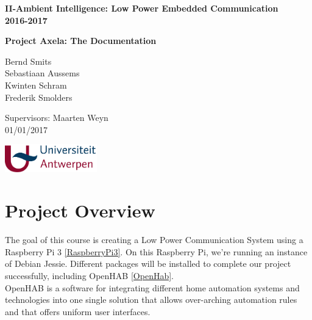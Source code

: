 \documentclass[a4paper,notitlepage]{article}
\begin{document}
\begin{titlepage}
    \centering
    \vfill
    {\bfseries\Large
        II-Ambient Intelligence: Low Power Embedded Communication\\2016-2017\\
        
    } 
    
    \hrulefill
    \vskip4cm
    
    {\bfseries\large
            Project Axela: The Documentation\\
            \vskip2cm
            
            Bernd Smits\\
            Sebastiaan Aussems\\
            Kwinten Schram\\
            Frederik Smolders\\
            \vskip2cm           
    }   
    {\bfseries   
            
            Supervisors: Maarten Weyn\\
           	01/01/2017   
            
            
            
            
    } 
    
    \vfill
    \includegraphics[width=4cm]{images/logo_UA_hor_kl_PMS.pdf}     
\end{titlepage}

\tableofcontents
\vfill
\newpage


\section*{Project Overview}

The goal of this course is creating a Low Power Communication System using a Raspberry Pi 3 \ref{RaspberryPi3}. On this Raspberry Pi, we're running an instance of Debian Jessie. Different packages will be installed to complete our project successfully, including OpenHAB \ref{OpenHab}.\\

OpenHAB is a software for integrating different home automation systems and technologies into one single solution that allows over-arching automation rules and that offers uniform user interfaces.
\end{document}
